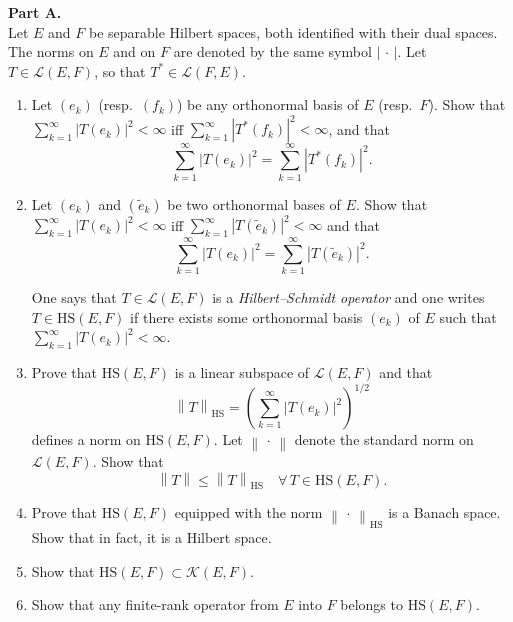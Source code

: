 \documentclass[12pt]{article}
\newcommand{\norm}[1]{\left\|#1\right\|}
\newcommand{\abs}[1]{\left|#1\right|}
\begin{document}
\medskip
 
\noindent\textbf{Part A.}\\
Let $E$ and $F$ be separable Hilbert spaces, both identified with their dual spaces.
The norms on $E$ and on $F$ are denoted by the same symbol $\abs{\,\cdot\,}$. Let
$T \in \mathcal{L}(E,F)$, so that $T^* \in \mathcal{L}(F,E)$.
 
\begin{enumerate}
\item Let $(e_k)$ (resp.\ $(f_k)$) be any orthonormal basis of $E$ (resp.\ $F$). Show that
$\sum_{k=1}^\infty \abs{T(e_k)}^2 < \infty$ iff $\sum_{k=1}^\infty \abs{T^*(f_k)}^2 < \infty$, and that
\[
\sum_{k=1}^\infty \abs{T(e_k)}^2 = \sum_{k=1}^\infty \abs{T^*(f_k)}^2.
\]
 
\item Let $(e_k)$ and $(\tilde{e}_k)$ be two orthonormal bases of $E$. Show that
$\sum_{k=1}^\infty \abs{T(e_k)}^2 < \infty$ iff $\sum_{k=1}^\infty \abs{T(\tilde{e}_k)}^2 < \infty$ and that
\[
\sum_{k=1}^\infty \abs{T(e_k)}^2 = \sum_{k=1}^\infty \abs{T(\tilde{e}_k)}^2.
\]
 
One says that $T \in \mathcal{L}(E,F)$ is a \emph{Hilbert--Schmidt operator} and one writes
$T \in \mathrm{HS}(E,F)$ if there exists some orthonormal basis $(e_k)$ of $E$ such that
$\sum_{k=1}^\infty \abs{T(e_k)}^2 < \infty$.
 
\item Prove that $\mathrm{HS}(E,F)$ is a linear subspace of $\mathcal{L}(E,F)$ and that
\[
\norm{T}_{\mathrm{HS}} = \left(\sum_{k=1}^\infty \abs{T(e_k)}^2\right)^{1/2}
\]
defines a norm on $\mathrm{HS}(E,F)$. Let $\norm{\,\cdot\,}$ denote the standard norm on $\mathcal{L}(E,F)$.
Show that
\[
\norm{T} \le \norm{T}_{\mathrm{HS}} \quad \forall\, T \in \mathrm{HS}(E,F).
\]
 
\item Prove that $\mathrm{HS}(E,F)$ equipped with the norm $\norm{\,\cdot\,}_{\mathrm{HS}}$ is a Banach space.
Show that in fact, it is a Hilbert space.
 
\item Show that $\mathrm{HS}(E,F) \subset \mathcal{K}(E,F)$.
 
\noindent[\textit{Hint:} Given $x \in E$, write $x = \sum_{k=1}^\infty x_k e_k$ and set $T_n(x) = \sum_{k=1}^n x_k T(e_k)$.
Show that $\norm{T_n - T} \to 0$ as $n \to \infty$.]
 
\item Show that any finite-rank operator from $E$ into $F$ belongs to $\mathrm{HS}(E,F)$.
 

\end{enumerate}
\end{document}
